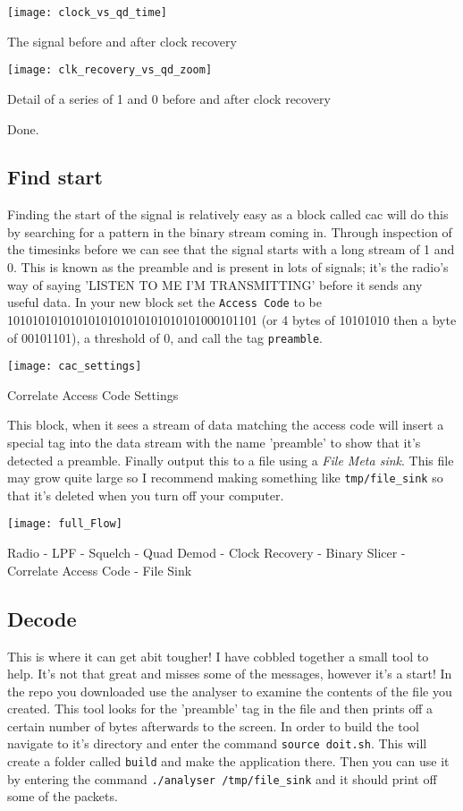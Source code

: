 \centrefigurestart
\texttt{[image: clock\_vs\_qd\_time]}
\caption{The signal before and after clock recovery}
\label{binslice}
\centrefigureend

\centrefigurestart
\texttt{[image: clk\_recovery\_vs\_qd\_zoom]}
\caption{Detail of a series of 1 and 0 before and after clock recovery}
\label{bindetail}
\centrefigureend


Done.

\subsection{Find start}
Finding the start of the signal is relatively easy as a block called \Gls{cac} will do this by searching for a pattern in the binary stream coming in. Through inspection of the \gls{timesink}s before we can see that the signal starts with a long stream of 1 and 0. This is known as the \gls{preamble} and is present in lots of signals; it's the radio's way of saying 'LISTEN TO ME I'M TRANSMITTING' before it sends any useful data. In your new block set the \verb|Access Code| to be 1010101010101010101010101010101000101101 (or 4 bytes of 10101010 then a byte of 00101101), a threshold of 0, and call the tag \verb|preamble|.

\centrefigurestart
\texttt{[image: cac\_settings]}
\caption{Correlate Access Code Settings}
\centrefigureend

This block, when it sees a stream of data matching the access code will insert a special tag into the data stream with the name 'preamble' to show that it's detected a \gls{preamble}. Finally output this to a file using a \textit{File Meta \Gls{sink}}. This file may grow quite large so I recommend making something like \verb|tmp/file_sink| so that it's deleted when you turn off your computer.

\centrefigurestart
\texttt{[image: full\_Flow]}
\caption{Radio - LPF - Squelch - Quad Demod - Clock Recovery - Binary Slicer - Correlate Access Code - File Sink}
\centrefigureend
\subsection{Decode}
This is where it can get abit tougher! I have cobbled together a small tool to help. It's not that great and misses some of the messages, however it's a start! In the \gls{repo} you downloaded use the analyser to examine the contents of the file you created. This tool looks for the 'preamble' tag in the file and then prints off a certain number of bytes afterwards to the screen. In order to build the tool navigate to it's directory and enter the command \verb|source doit.sh|. This will create a folder called \verb|build| and make the application there. Then you can use it by entering the command \verb|./analyser /tmp/file_sink| and it should print off some of the packets.

